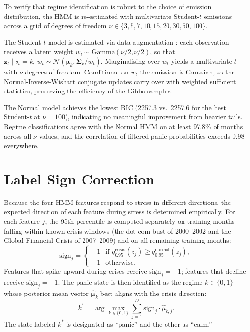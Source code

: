 To verify that regime identification is robust to the choice of emission distribution, the HMM is re-estimated with multivariate Student-$t$ emissions across a grid of degrees of freedom $\nu \in \{3, 5, 7, 10, 15, 20, 30, 50, 100\}$.

The Student-$t$ model is estimated via data augmentation \citep{Geweke1993}: each observation receives a latent weight $w_t \sim \text{Gamma}(\nu/2, \nu/2)$, so that $\mathbf{z}_t \mid s_t{=}k,\, w_t \sim \mathcal{N}(\boldsymbol{\mu}_k, \boldsymbol{\Sigma}_k / w_t)$. Marginalising over $w_t$ yields a multivariate $t$ with $\nu$ degrees of freedom. Conditional on $w_t$ the emission is Gaussian, so the Normal-Inverse-Wishart conjugate updates carry over with weighted sufficient statistics, preserving the efficiency of the Gibbs sampler.



The Normal model achieves the lowest BIC (2257.3 vs.\ 2257.6 for the best Student-$t$ at $\nu = 100$), indicating no meaningful improvement from heavier tails. Regime classifications agree with the Normal HMM on at least 97.8\% of months across all $\nu$ values, and the correlation of filtered panic probabilities exceeds 0.98 everywhere.

\section{Label Sign Correction}\label{app:label_switching}

Because the four HMM features respond to stress in different directions, the expected direction of each feature during stress is determined empirically. For each feature $j$, the 95th percentile is computed separately on training months falling within known crisis windows (the dot-com bust of 2000--2002 and the Global Financial Crisis of 2007--2009) and on all remaining training months:
\begin{equation}
\text{sign}_j =
\begin{cases}
+1 & \text{if } q_{0.95}^{\text{crisis}}(z_j) \geq q_{0.95}^{\text{normal}}(z_j), \\
-1 & \text{otherwise}.
\end{cases}
\end{equation}
Features that spike upward during crises receive $\text{sign}_j = +1$; features that decline receive $\text{sign}_j = -1$. The panic state is then identified as the regime $k \in \{0, 1\}$ whose posterior mean vector $\hat{\boldsymbol{\mu}}_k$ best aligns with the crisis direction:
\begin{equation}
k^\ast = \arg\max_{k \in \{0,1\}} \sum_{j=1}^{D} \text{sign}_j \cdot \hat{\mu}_{k,j}.
\end{equation}
The state labeled $k^\ast$ is designated as ``panic'' and the other as ``calm.''


